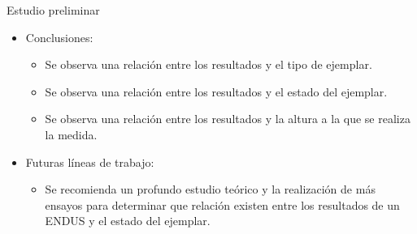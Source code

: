 \documentclass[utf8, compress]			{beamer}
\begin{document}
\begin{frame}{Estudio preliminar}
    \begin{itemize}
	\item Conclusiones:
	    \begin{itemize}
		\item Se observa una relación entre los resultados y el
		    tipo de ejemplar.
		\item Se observa una relación entre los resultados y el
		    estado del ejemplar.
		\item Se observa una relación entre los resultados y la
		    altura a la que se realiza la medida.
	    \end{itemize}
	\item Futuras líneas de trabajo:
	    \begin{itemize}
		\item Se recomienda un profundo estudio teórico y la
		    realización de más ensayos para determinar que relación
		    existen entre los resultados de un ENDUS y el estado
		    del ejemplar.
	    \end{itemize}
    \end{itemize}
\end{frame}
\end{document}
